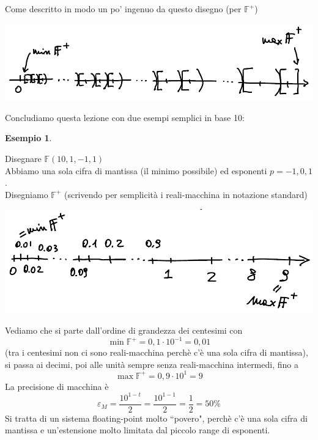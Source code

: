 \documentclass[12pt]{article}
\newtheorem*{esempio}{Esempio}
\begin{document}
Come descritto in modo un po' ingenuo da questo disegno (per $\mathbb{F}^+$) 
\begin{center}
    \includegraphics[scale=0.65]{img9.png}
\end{center}
Concludiamo questa lezione con due esempi semplici in base 10:
\begin{esempio} \end{esempio}
Disegnare $\mathbb{F}(10, 1, -1, 1)$ \\
Abbiamo una sola cifra di mantissa (il minimo possibile) ed esponenti $p = -1, 0, 1$.\\
Disegniamo $\mathbb{F}^+$ (scrivendo per semplicità i reali-macchina in notazione standard) 
\begin{center}
    \includegraphics[scale=0.65]{img10.png}
\end{center}
Vediamo che si parte dall'ordine di grandezza dei centesimi con 
\[ \min \mathbb{F}^+ = 0,1 \cdot 10^{-1} = 0,01 \]
(tra i centesimi non ci sono reali-macchina perchè c'è una sola cifra di mantissa), si passa ai decimi, poi alle unità sempre senza reali-macchina intermedi, fino a
\[ \max \mathbb{F}^+ = 0,9 \cdot 10^1 = 9 \]
La precisione di macchina è 
\[ \varepsilon_M = \frac{10^{1-t}}{2} = \frac{10^{1-1}}{2} = \frac{1}{2} = 50\% \]
Si tratta di un sistema floating-point molto ``povero", perchè c'è una sola cifra di mantissa e un'estensione molto limitata dal piccolo range di esponenti.
\end{document}
